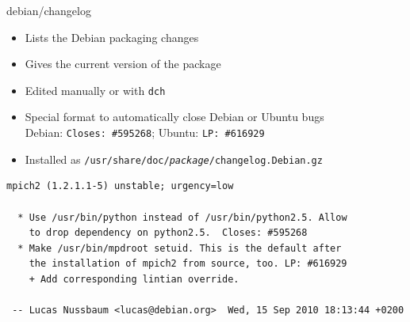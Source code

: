 \documentclass[10pt,final]{beamer}
\begin{document}
\begin{frame}[fragile]{debian/changelog}
  \begin{itemize}
  \item Lists the Debian packaging changes
  \item Gives the current version of the package
  \begin{center}
\end{center}


  \item Edited manually or with \texttt{dch}
  \item Special format to automatically close Debian or Ubuntu bugs\\
    Debian: \texttt{Closes:~\#595268}; Ubuntu: \texttt{LP:~\#616929}
  \item Installed as \texttt{/usr/share/doc/\textit{package}/changelog.Debian.gz}
  \end{itemize}
  \begin{lstlisting}[basicstyle=\ttfamily\footnotesize]
mpich2 (1.2.1.1-5) unstable; urgency=low

  * Use /usr/bin/python instead of /usr/bin/python2.5. Allow
    to drop dependency on python2.5.  Closes: #595268
  * Make /usr/bin/mpdroot setuid. This is the default after
    the installation of mpich2 from source, too. LP: #616929
    + Add corresponding lintian override.

 -- Lucas Nussbaum <lucas@debian.org>  Wed, 15 Sep 2010 18:13:44 +0200
\end{lstlisting}
\end{frame}
\end{document}
